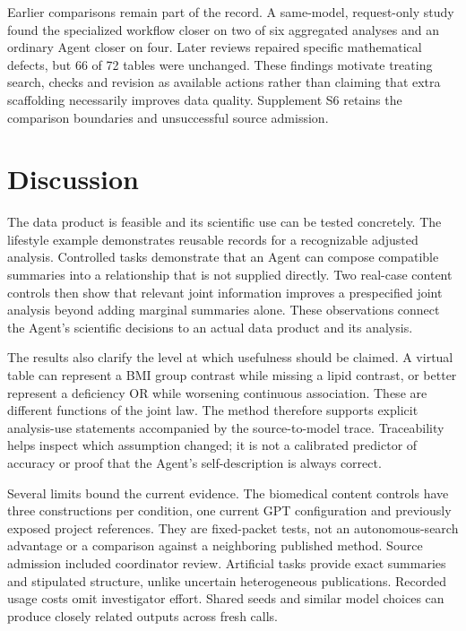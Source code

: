 \documentclass[11pt,letterpaper]{article}
\begin{document}
Earlier comparisons remain part of the record. A same-model, request-only study found the specialized workflow closer on two of six aggregated analyses and an ordinary Agent closer on four. Later reviews repaired specific mathematical defects, but 66 of 72 tables were unchanged. These findings motivate treating search, checks and revision as available actions rather than claiming that extra scaffolding necessarily improves data quality. Supplement S6 retains the comparison boundaries and unsuccessful source admission.



\section{Discussion}

The data product is feasible and its scientific use can be tested concretely. The lifestyle example demonstrates reusable records for a recognizable adjusted analysis. Controlled tasks demonstrate that an Agent can compose compatible summaries into a relationship that is not supplied directly. Two real-case content controls then show that relevant joint information improves a prespecified joint analysis beyond adding marginal summaries alone. These observations connect the Agent's scientific decisions to an actual data product and its analysis.


The results also clarify the level at which usefulness should be claimed. A virtual table can represent a BMI group contrast while missing a lipid contrast, or better represent a deficiency OR while worsening continuous association. These are different functions of the joint law. The method therefore supports explicit analysis-use statements accompanied by the source-to-model trace. Traceability helps inspect which assumption changed; it is not a calibrated predictor of accuracy or proof that the Agent's self-description is always correct.


Several limits bound the current evidence. The biomedical content controls have three constructions per condition, one current GPT configuration and previously exposed project references. They are fixed-packet tests, not an autonomous-search advantage or a comparison against a neighboring published method. Source admission included coordinator review. Artificial tasks provide exact summaries and stipulated structure, unlike uncertain heterogeneous publications. Recorded usage costs omit investigator effort. Shared seeds and similar model choices can produce closely related outputs across fresh calls.
\end{document}
